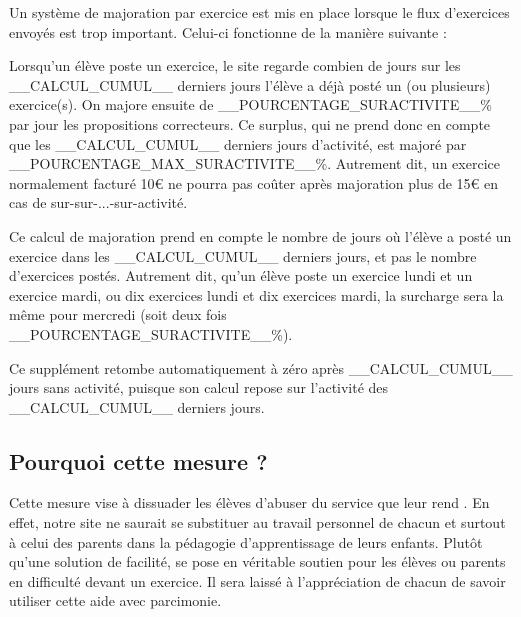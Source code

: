 ﻿Un système de majoration par exercice est mis en place lorsque le flux d'exercices envoyés est trop important. Celui-ci fonctionne de la manière suivante :
\item Lorsqu'un élève poste un exercice, le site regarde combien de jours sur les __CALCUL_CUMUL__ derniers jours l'élève a déjà posté un (ou plusieurs) exercice(s). On majore ensuite de __POURCENTAGE_SURACTIVITE__\% par jour les propositions correcteurs. Ce surplus, qui ne prend donc en compte que les __CALCUL_CUMUL__ derniers jours d'activité, est majoré par __POURCENTAGE_MAX_SURACTIVITE__\%. Autrement dit, un exercice normalement facturé 10€ ne pourra pas coûter après majoration plus de 15€ en cas de sur-sur-...-sur-activité.
\item Ce calcul de majoration prend en compte le nombre de jours où l'élève a posté un exercice dans les __CALCUL_CUMUL__ derniers jours, et pas le nombre d'exercices postés. Autrement dit, qu'un élève poste un exercice lundi et un exercice mardi, ou dix exercices lundi et dix exercices mardi, la surcharge sera la même pour mercredi (soit deux fois __POURCENTAGE_SURACTIVITE__\%).
\item Ce supplément retombe automatiquement à zéro après __CALCUL_CUMUL__ jours sans activité, puisque son calcul repose sur l'activité des __CALCUL_CUMUL__ derniers jours.

\subsection{Pourquoi cette mesure ?}

Cette mesure vise à dissuader les élèves d'abuser du service que leur rend \eDevoir. En effet, notre site ne saurait se substituer au travail personnel de chacun et surtout à celui des parents dans la pédagogie d'apprentissage de leurs enfants. Plutôt qu'une solution de facilité, \eDevoir se pose en véritable soutien pour les élèves ou parents en difficulté devant un exercice.
Il sera laissé à l'appréciation de chacun de savoir utiliser cette aide avec parcimonie.
